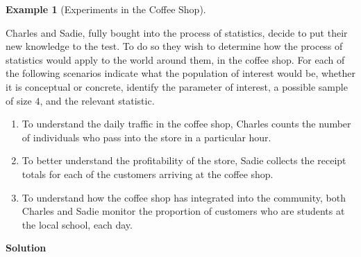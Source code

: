 \documentclass[
  letterpaper,
  DIV=11,
  numbers=noendperiod]{scrreprt}
\providecommand{\tightlist}{%
  \setlength{\itemsep}{0pt}\setlength{\parskip}{0pt}}\usepackage{longtable,booktabs,array}
\theoremstyle{definition}
\theoremstyle{definition}
\newtheorem{example}{Example}[chapter]
\theoremstyle{definition}
\theoremstyle{remark}
\begin{document}
\begin{example}[Experiments in the Coffee
Shop]\protect\hypertarget{exm-process-of-statistics}{}\label{exm-process-of-statistics}

Charles and Sadie, fully bought into the process of statistics, decide
to put their new knowledge to the test. To do so they wish to determine
how the process of statistics would apply to the world around them, in
the coffee shop. For each of the following scenarios indicate what the
population of interest would be, whether it is conceptual or concrete,
identify the parameter of interest, a possible sample of size \(4\), and
the relevant statistic.

\begin{enumerate}
\def\labelenumi{\alph{enumi}.}
\tightlist
\item
  To understand the daily traffic in the coffee shop, Charles counts the
  number of individuals who pass into the store in a particular hour.
\item
  To better understand the profitability of the store, Sadie collects
  the receipt totals for each of the customers arriving at the coffee
  shop.
\item
  To understand how the coffee shop has integrated into the community,
  both Charles and Sadie monitor the proportion of customers who are
  students at the local school, each day.
\end{enumerate}

\begin{tcolorbox}[enhanced jigsaw, colback=white, colframe=quarto-callout-color-frame, arc=.35mm, leftrule=.75mm, rightrule=.15mm, opacityback=0, breakable, bottomrule=.15mm, left=2mm, toprule=.15mm]

\vspace{-3mm}\textbf{Solution}\vspace{3mm}


\end{tcolorbox}
\end{example}
\end{document}
